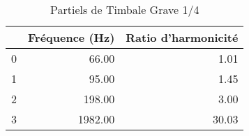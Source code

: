 \begin{table}
\centering
\caption{Partiels de Timbale Grave 1/4}
\label{table:partiels-timbale-grave-1.wav}
\begin{tabular}{lrr}
\toprule
{} &  Fréquence (Hz) &  Ratio d'harmonicité \\
\midrule
0 &           66.00 &                 1.01 \\
1 &           95.00 &                 1.45 \\
2 &          198.00 &                 3.00 \\
3 &         1982.00 &                30.03 \\
\bottomrule
\end{tabular}
\end{table}
